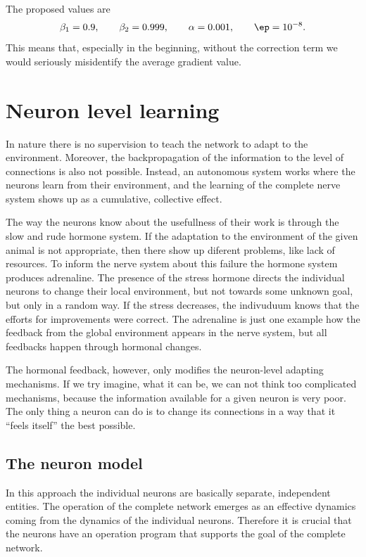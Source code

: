 \documentclass[10pt,a4paper]{article}
\begin{document}
The proposed values are
\begin{equation}
  \beta_1 = 0.9,\qquad \beta_2=0.999,\qquad \alpha=0.001,\qquad \ep=10^{-8}.
\end{equation}
This means that, especially in the beginning, without the correction term we would seriously misidentify the average gradient value.

\section{Neuron level learning}

In nature there is no supervision to teach the network to adapt to the environment. Moreover, the backpropagation of the information to the level of connections is also not possible. Instead, an autonomous system works where the neurons learn from their environment, and the learning of the complete nerve system shows up as a cumulative, collective effect.

The way the neurons know about the usefullness of their work is through the slow and rude hormone system. If the adaptation to the environment of the given animal is not appropriate, then there show up diferent problems, like lack of resources. To inform the nerve system about this failure the hormone system produces adrenaline. The presence of the stress hormone directs the individual neurons to change their local environment, but not towards some unknown goal, but only in a random way. If the stress decreases, the indivuduum knows that the efforts for improvements were correct. The adrenaline is just one example how the feedback from the global environment appears in the nerve system, but all feedbacks happen through hormonal changes.

The hormonal feedback, however, only modifies the neuron-level adapting mechanisms. If we try imagine, what it can be, we can not think too complicated mechanisms, because the information available for a given neuron is very poor. The only thing a neuron can do is to change its connections in a way that it ``feels itself'' the best possible.

\subsection{The neuron model}

In this approach the individual neurons are basically separate, independent entities. The operation of the complete network emerges as an effective dynamics coming from the dynamics of the individual neurons. Therefore it is crucial that the neurons have an operation program that supports the goal of the complete network.
\end{document}
